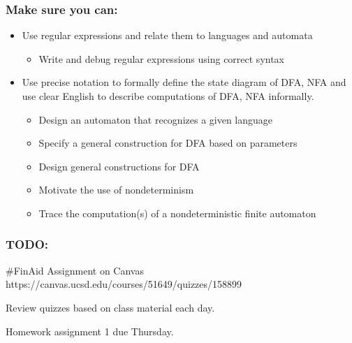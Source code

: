 \subsubsection*{Make sure you can:}

\begin{itemize}
\item Use regular expressions and relate them to languages and automata
\begin{itemize}

   \item Write and debug regular expressions using correct syntax

\end{itemize}

\item Use precise notation to formally define the state diagram of DFA, NFA and 
use clear English to describe computations of DFA, NFA informally.

\begin{itemize}
   \item Design an automaton that recognizes a given language

   \item Specify a general construction for DFA based on parameters

   \item Design general constructions for DFA

   \item Motivate the use of nondeterminism

   \item Trace the computation(s) of a nondeterministic finite automaton

\end{itemize}






\end{itemize}

\subsubsection*{TODO:}
\begin{list}
   {\itemsep2pt}
   \item \#FinAid Assignment on Canvas https://canvas.ucsd.edu/courses/51649/quizzes/158899
   \item Review quizzes based on class material each day. 
   \item Homework assignment 1 due Thursday.
\end{list}

